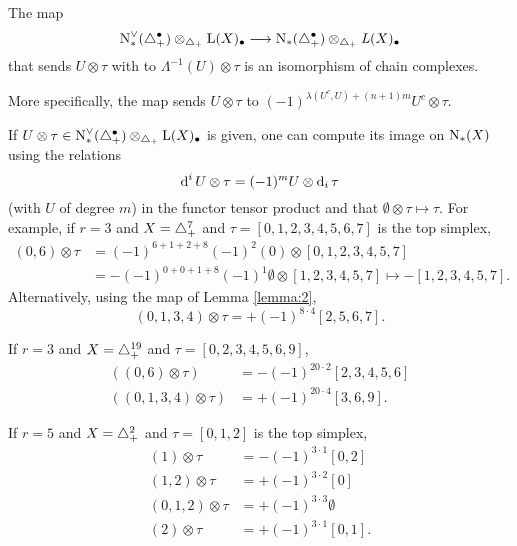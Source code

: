 \begin{lemma}\label{lemma:2} The map
	\[
	\operatorname{N}^\vee_{*}(\triangle_{+}^\bullet)\otimes_{\triangle_{+}} \operatorname{L}(X)_\bullet \longrightarrow \operatorname{N}_{*}(\triangle_{+}^\bullet)\otimes_{\triangle_{+}} \operatorname{{\it L}}(X)_\bullet
	\]
	that sends $U\otimes \tau$ with to $\Lambda^{-1}(U)\otimes \tau$ is an isomorphism of chain complexes.
\end{lemma}
More specifically, the map sends $U\otimes \tau$ to $(-1)^{\lambda(U^c,U)+(n+1)m} U^c\otimes \tau$. 
\begin{example}\label{example:first3} If $U\otimes \tau\in \operatorname{N}^\vee_{*}(\triangle_{+}^\bullet)\otimes_{\triangle_{+}} \operatorname{L}(X)_\bullet$ is given, one can compute its image on $\operatorname{N}_{*}(X)$ using the relations
\[
	\operatorname{d}^i U\otimes \tau = (-1)^{m} U\otimes \operatorname{d}_i\tau
\]
 (with $U$ of degree $m$) in the functor tensor product and that $\emptyset \otimes \tau \mapsto \tau$. For example, if $r=3$ and $X=\triangle_{+}^7$ and $\tau = [0,1,2,3,4,5,6,7]$ is the top simplex,
\begin{align*}
		(0,6)\otimes \tau &= (-1)^{6+1+2+8}(-1)^2(0)\otimes [0,1,2,3,4,5,7] 
		\\
		&= -(-1)^{0+0+1+8}(-1)^1\emptyset\otimes [1,2,3,4,5,7]\mapsto -[1,2,3,4,5,7].
\end{align*}
Alternatively, using the map of Lemma \ref{lemma:2},
\[
	(0,1,3,4)\otimes \tau = +(-1)^{8\cdot 4}[2,5,6,7].
\]
	\end{example}
	\begin{example}\label{example:first3'} If $r=3$ and $X=\triangle_{+}^{19}$ and $\tau = [0,2,3,4,5,6,9]$,
\begin{align*}
		((0,6)\otimes \tau) &= -(-1)^{20\cdot 2} [2,3,4,5,6]
		\\
		((0,1,3,4)\otimes \tau) &= +(-1)^{20\cdot 4}[3,6,9].
	\end{align*}
	\end{example}
	\begin{example}\label{example:first5} If $r=5$ and $X=\triangle_{+}^2$ and $\tau = [0,1,2]$ is the top simplex,
	\[
	\begin{split}
		(1)\otimes \tau &= - (-1)^{3\cdot 1} [0,2]  
		\\
		(1,2)\otimes \tau &= +(-1)^{3\cdot 2} [0]
		\\
		(0,1,2)\otimes \tau &= +(-1)^{3\cdot 3}\emptyset
		\\
		(2)\otimes \tau &= +(-1)^{3\cdot 1} [0,1].
		\end{split}
	\]
	\end{example}

